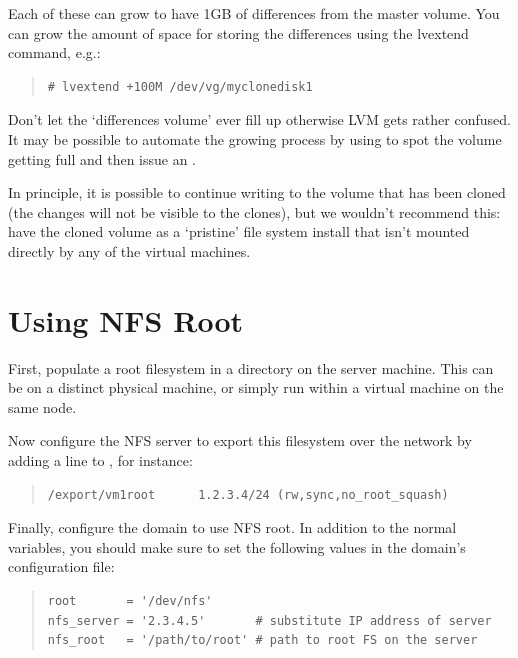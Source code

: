 \documentclass[11pt,twoside,final,openright]{report}
\begin{document}
Each of these can grow to have 1GB of differences from the master
volume. You can grow the amount of space for storing the differences
using the lvextend command, e.g.:
\begin{quote}
\begin{verbatim}
# lvextend +100M /dev/vg/myclonedisk1
\end{verbatim}
\end{quote}

Don't let the `differences volume' ever fill up otherwise LVM gets
rather confused. It may be possible to automate the growing process by
using  to spot the volume getting full and then
issue an .

In principle, it is possible to continue writing to the volume that
has been cloned (the changes will not be visible to the clones), but
we wouldn't recommend this: have the cloned volume as a `pristine'
file system install that isn't mounted directly by any of the virtual
machines.


\section{Using NFS Root}

First, populate a root filesystem in a directory on the server
machine. This can be on a distinct physical machine, or simply run
within a virtual machine on the same node.

Now configure the NFS server to export this filesystem over the
network by adding a line to , for instance:

\begin{quote}
  \begin{small}
\begin{verbatim}
/export/vm1root      1.2.3.4/24 (rw,sync,no_root_squash)
\end{verbatim}
  \end{small}
\end{quote}

Finally, configure the domain to use NFS root.  In addition to the
normal variables, you should make sure to set the following values in
the domain's configuration file:

\begin{quote}
  \begin{small}
\begin{verbatim}
root       = '/dev/nfs'
nfs_server = '2.3.4.5'       # substitute IP address of server
nfs_root   = '/path/to/root' # path to root FS on the server
\end{verbatim}
  \end{small}
\end{quote}
\end{document}

